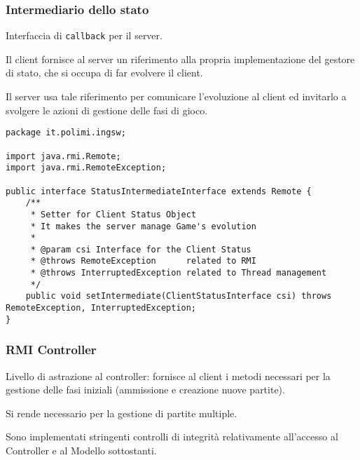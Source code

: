 \documentclass[a4paper,11pt]{article} %
\begin{document}
    \subsubsection{Intermediario dello stato}

    Interfaccia di \texttt{callback} per il server.

    Il client fornisce al server un riferimento alla propria implementazione del gestore di stato, che si occupa di far evolvere il client.

    Il server usa tale riferimento per comunicare l'evoluzione al client ed invitarlo a svolgere le azioni di gestione delle fasi di gioco.

    \begin{verbatim}
package it.polimi.ingsw;

import java.rmi.Remote;
import java.rmi.RemoteException;

public interface StatusIntermediateInterface extends Remote {
    /**
     * Setter for Client Status Object
     * It makes the server manage Game's evolution
     *
     * @param csi Interface for the Client Status
     * @throws RemoteException      related to RMI
     * @throws InterruptedException related to Thread management
     */
    public void setIntermediate(ClientStatusInterface csi) throws RemoteException, InterruptedException;
}
    \end{verbatim}

    \newpage

    \subsubsection{RMI Controller}
    Livello di astrazione al controller: fornisce al client i metodi necessari per la gestione delle fasi iniziali (ammissione e creazione nuove partite).

    Si rende necessario per la gestione di partite multiple.

    Sono implementati stringenti controlli di integrità relativamente all'accesso al Controller e al Modello sottostanti.
\end{document}
